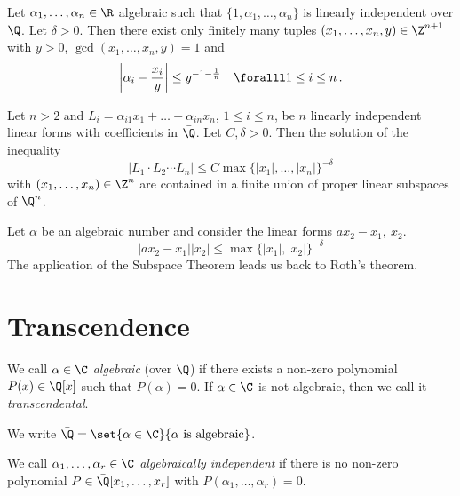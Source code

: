 \begin{thm*}
	Let \( \alpha_1, \dotsc, \alpha_n \in \R \) algebraic such that \( \{1, \alpha_1, \dotsc, \alpha_n\} \) is linearly independent over \( \Q \).
	Let \( \delta > 0 \).
	Then there exist only finitely many tuples \( (x_1, \dotsc, x_n, y) \in \Z^{n+1} \) with \( y>0 \), \( \gcd(x_1, \dotsc, x_n, y)=1 \) and
	\[ \left| \alpha_i - \frac{x_i}{y} \right| \leq y^{-1 - \frac{1}{n}} \quad \foralll 1 \leq i \leq n \,. \]
\end{thm*}

\begin{thm*}
	Let \( n>2 \) and \( L_i = \alpha_{i1} x_1 + \dots + \alpha_{in}x_n \), \( 1 \leq i \leq n \), be \( n \) linearly independent linear forms with coefficients in \( \bar{\Q} \).
	Let \( C, \delta > 0 \).
	Then the solution of the inequality
	\[ \left| L_1 \cdot L_2 \dotsm L_n \right| \leq C \max \{|x_1|, \dotsc, |x_n|\}^{-\delta} \]
	with \( (x_1, \dotsc, x_n) \in \Z^n \) are contained in a finite union of proper linear subspaces of \( \Q^n \).
\end{thm*}

\begin{exmp*}
	Let \( \alpha \) be an algebraic number and consider the linear forms \( ax_2 - x_1,\ x_2 \).
	\[ |ax_2 - x_1| |x_2| \leq \max \{|x_1|, |x_2|\}^{-\delta} \]
	The application of the Subspace Theorem leads us back to Roth's theorem.
\end{exmp*}


\section{Transcendence}

\begin{defn*}
	We call \( \alpha \in \C \) \emph{algebraic} (over \( \Q \)) if there exists a non-zero polynomial \( P(x) \in \Q[x] \) such that \( P(\alpha) = 0 \).
	If \( \alpha \in \C \) is not algebraic, then we call it \emph{transcendental}.
\end{defn*}

\begin{notat*}
	We write \( \bar{\Q} = \set{\alpha \in \C}{\alpha \ \text{is algebraic}} \).
\end{notat*}

\begin{defn*}
	We call \( \alpha_1, \dotsc, \alpha_r \in \C \) \emph{algebraically independent} if there is no non-zero polynomial \( P \in \bar{\Q}[x_1, \dotsc, x_r] \) with \( P(\alpha_1, \dotsc, \alpha_r) = 0 \).
\end{defn*}

